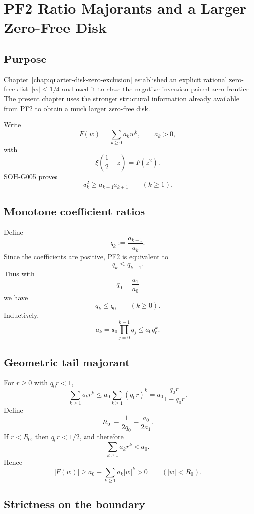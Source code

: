 \chapter{PF2 Ratio Majorants and a Larger Zero-Free Disk}
\label{chap:pf2-ratio-zero-free-disk}


\section{Purpose}

Chapter~\ref{chap:quarter-disk-zero-exclusion} established an explicit rational zero-free disk $|w|\le1/4$ and used it to close the negative-inversion paired-zero frontier. The present chapter uses the stronger structural information already available from PF2 to obtain a much larger zero-free disk.

Write
\[
 F(w)=\sum_{k\ge0}a_k w^k,
 \qquad a_k>0,
\]
with
\[
 \xi\!\left(\frac12+z\right)=F(z^2).
\]
SOH-G005 proves
\[
 a_k^2\ge a_{k-1}a_{k+1}
 \qquad(k\ge1).
\]

\section{Monotone coefficient ratios}

Define
\[
 q_k:=\frac{a_{k+1}}{a_k}.
\]
Since the coefficients are positive, PF2 is equivalent to
\[
 q_k\le q_{k-1}.
\]
Thus with
\[
 q_0=\frac{a_1}{a_0}
\]
we have
\[
 q_k\le q_0
 \qquad(k\ge0).
\]
Inductively,
\[
 a_k
 =a_0\prod_{j=0}^{k-1}q_j
 \le a_0q_0^k.
\]

\section{Geometric tail majorant}

For $r\ge0$ with $q_0r<1$,
\[
 \sum_{k\ge1}a_kr^k
 \le a_0\sum_{k\ge1}(q_0r)^k
 =a_0\frac{q_0r}{1-q_0r}.
\]
Define
\[
 \boxed{
 R_0:=\frac1{2q_0}=\frac{a_0}{2a_1}.}
\]
If $r<R_0$, then $q_0r<1/2$, and therefore
\[
 \sum_{k\ge1}a_kr^k<a_0.
\]
Hence
\[
 |F(w)|
 \ge a_0-\sum_{k\ge1}a_k|w|^k
 >0
 \qquad(|w|<R_0).
\]

\section{Strictness on the boundary}

